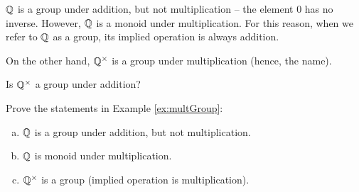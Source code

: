 \documentclass[../algebraNotesMSRI-UP2016.tex]{subfiles}
\begin{document}
\begin{frame}
\begin{ex}\label{ex:multGroup}
$\mathbb Q$ is a group under addition, but not multiplication -- the element $0$ has no inverse.  However, $\mathbb Q$ is a monoid under multiplication.  For this reason, when we refer to $\mathbb Q$ as a group, its implied operation is always addition.

\smallGap
On the other hand, $\mathbb Q^{\times}$ is a group under multiplication (hence, the name).  
\end{ex}

\begin{que}
Is $\mathbb Q^{\times}$ a group under addition?
\end{que}

\begin{exe}\label{exe:Zmonoid}
Prove the statements in Example \ref{ex:multGroup}:
\begin{enumerate}[(a)]
\item $\mathbb Q$ is a group under addition, but not multiplication.
\item $\mathbb Q$ is monoid under multiplication.
\item $\mathbb Q^{\times}$ is a group (implied operation is multiplication).
\end{enumerate}
\end{exe}
\end{frame}
\end{document}
